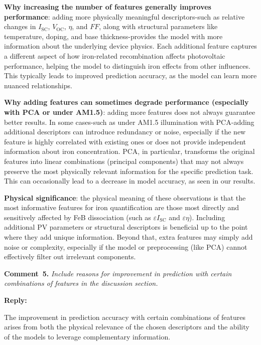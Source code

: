 \documentclass[a4paper,fleqn]{cas-sc}
\begin{document}
\textbf{Why increasing the number of features generally improves performance}:
adding more physically meaningful descriptors-such as relative changes in $I_\mathrm{SC}$, $V_\mathrm{OC}$, $\eta$, and $FF$, along with structural parameters like temperature, doping, and base thickness-provides the model with more information about the underlying device physics.
Each additional feature captures a different aspect of how iron-related recombination affects photovoltaic performance, helping the model to distinguish iron effects from other influences.
This typically leads to improved prediction accuracy, as the model can learn more nuanced relationships.


\textbf{Why adding features can sometimes degrade performance (especially with PCA or under AM1.5)}:
adding more features does not always guarantee better results.
In some cases-such as under AM1.5 illumination with PCA-adding additional descriptors can introduce redundancy or noise, especially if the new feature is highly correlated with existing ones or does not provide independent information about iron concentration.
PCA, in particular, transforms the original features into linear combinations (principal components) that may not always preserve the most physically relevant information for the specific prediction task.
This can occasionally lead to a decrease in model accuracy, as seen in our results.


\textbf{Physical significance}: the physical meaning of these observations is that the most informative features for iron quantification are those most directly and sensitively affected by FeB dissociation (such as $\varepsilon I_\mathrm{SC}$ and $\varepsilon \eta$).
Including additional PV parameters or structural descriptors is beneficial up to the point where they add unique information.
Beyond that, extra features may simply add noise or complexity, especially if the model or preprocessing (like PCA) cannot effectively filter out irrelevant components.


\vspace{1cm}
\noindent
\textcolor[rgb]{0.00,0.50,1.00}{\textbf{Comment~5.}}
\emph{Include reasons for improvement in prediction with certain combinations of features in the discussion section.}

\noindent
\textcolor[rgb]{0.51,0.00,0.00}{\textbf{Reply:}}

The improvement in prediction accuracy with certain combinations of features arises from both the physical relevance of the chosen descriptors and the ability of the models to leverage complementary information.
\end{document}

